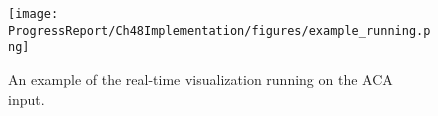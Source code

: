 \begin{figure}[ht]
    \centering
    \centerline{\texttt{[image: ProgressReport/Ch48Implementation/figures/example\_running.png]}}
    \caption{An example of the real-time visualization running on the ACA input.}
    \label{fig:ExampleRunning}
\end{figure}